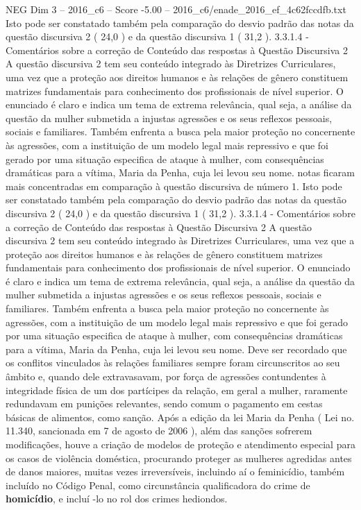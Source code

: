 \begin{textsample}{NEG Dim 3 – 2016\_c6 – Score -5.00 – 2016\_c6/enade\_2016\_ef\_4c62fccdfb.txt}
Isto pode ser constatado também pela comparação do desvio padrão das notas da questão discursiva 2 ( 24,0 ) e da questão discursiva 1 ( 31,2 ). 3.3.1.4 - Comentários sobre a correção de Conteúdo das respostas à Questão Discursiva 2 A questão discursiva 2 tem seu conteúdo integrado às Diretrizes Curriculares, uma vez que a proteção aos direitos humanos e às relações de gênero constituem matrizes fundamentais para conhecimento dos profissionais de nível superior.
O enunciado é claro e indica um tema de extrema relevância, qual seja, a análise da questão da mulher submetida a injustas agressões e os seus reflexos pessoais, sociais e familiares.
Também enfrenta a busca pela maior proteção no concernente às agressões, com a instituição de um modelo legal mais repressivo e que foi gerado por uma situação especifica de ataque à mulher, com consequências dramáticas para a vítima, Maria da Penha, cuja lei levou seu nome. notas ficaram mais concentradas em comparação à questão discursiva de número 1.
Isto pode ser constatado também pela comparação do desvio padrão das notas da questão discursiva 2 ( 24,0 ) e da questão discursiva 1 ( 31,2 ). 3.3.1.4 - Comentários sobre a correção de Conteúdo das respostas à Questão Discursiva 2 A questão discursiva 2 tem seu conteúdo integrado às Diretrizes Curriculares, uma vez que a proteção aos direitos humanos e às relações de gênero constituem matrizes fundamentais para conhecimento dos profissionais de nível superior.
O enunciado é claro e indica um tema de extrema relevância, qual seja, a análise da questão da mulher submetida a injustas agressões e os seus reflexos pessoais, sociais e familiares.
Também enfrenta a busca pela maior proteção no concernente às agressões, com a instituição de um modelo legal mais repressivo e que foi gerado por uma situação especifica de ataque à mulher, com consequências dramáticas para a vítima, Maria da Penha, cuja lei levou seu nome.
Deve ser recordado que os conflitos vinculados às relações familiares sempre foram circunscritos ao seu âmbito e, quando dele extravasavam, por força de agressões contundentes à integridade física de um dos partícipes da relação, em geral a mulher, raramente redundavam em punições relevantes, sendo comum o pagamento em cestas básicas de alimentos, como sanção.
Após a edição da lei Maria da Penha ( Lei no. 11.340, sancionada em 7 de agosto de 2006 ), além das sanções sofrerem modificações, houve a criação de modelos de proteção e atendimento especial para os casos de violência doméstica, procurando proteger as mulheres agredidas antes de danos maiores, muitas vezes irreversíveis, incluindo aí o feminicídio, também incluído no Código Penal, como circunstância qualificadora do crime de \textbf{homicídio}, e incluí -lo no rol dos crimes hediondos.

\end{textsample}
